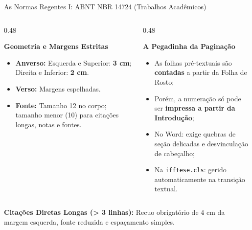\documentclass[aspectratio=169, 10pt]{beamer}
\begin{document}
\begin{frame}{As Normas Regentes I: ABNT NBR 14724 (Trabalhos Acadêmicos)}
  \begin{columns}[T]
    \begin{column}{0.48\textwidth}
      \begin{block}{\textbf{Geometria e Margens Estritas}}
        \begin{itemize}
          \item \textbf{Anverso:} Esquerda e Superior: \textbf{3 cm}; Direita e Inferior: \textbf{2 cm}.
          \item \textbf{Verso:} Margens espelhadas.
          \item \textbf{Fonte:} Tamanho 12 no corpo; tamanho menor (10) para citações longas, notas e fontes.
        \end{itemize}
      \end{block}
    \end{column}

    \begin{column}{0.48\textwidth}
      \begin{alertblock}{\textbf{A Pegadinha da Paginação}}
        \begin{itemize}
          \item As folhas pré-textuais são \textbf{contadas} a partir da Folha de Rosto;
          \item Porém, a numeração só pode ser \textbf{impressa a partir da Introdução};
          \item No Word: exige quebras de seção delicadas e desvinculação de cabeçalho;
          \item Na \texttt{ifftese.cls}: gerido automaticamente na transição textual.
        \end{itemize}
      \end{alertblock}
    \end{column}
  \end{columns}
  \vspace{0.2cm}
  \begin{tcolorbox}[colback=codebg,colframe=gray!50]
    \centering \footnotesize \textbf{Citações Diretas Longas (> 3 linhas):} Recuo obrigatório de 4 cm da margem esquerda, fonte reduzida e espaçamento simples.
  \end{tcolorbox}
\end{frame}
\end{document}
